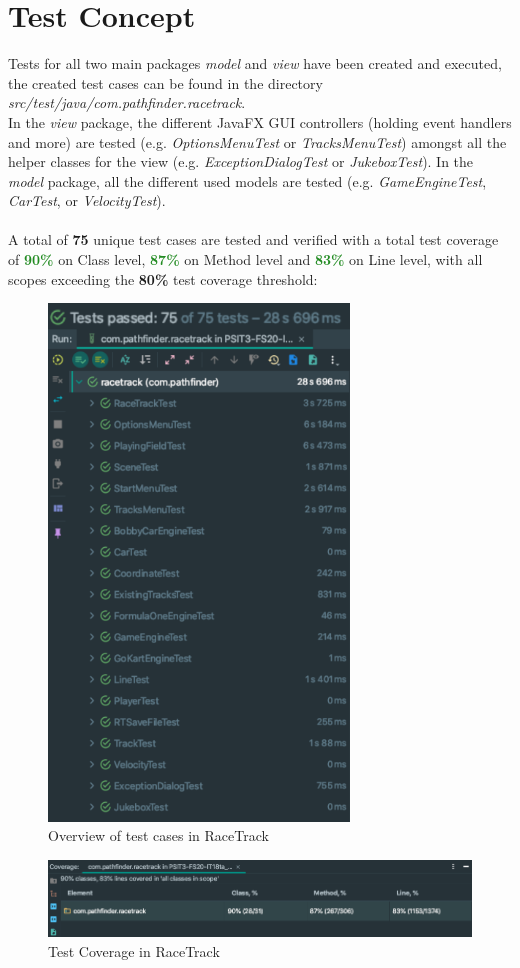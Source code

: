 \section{Test Concept}
	Tests for all two main packages \textit{model} and \textit{view} have been created and executed, the created test cases can be found in the directory \textit{src/test/java/com.pathfinder.racetrack}. \\
	In the \textit{view} package, the different JavaFX GUI controllers (holding event handlers and more) are tested (e.g. \textit{OptionsMenuTest} or \textit{TracksMenuTest}) amongst all the helper classes for the view (e.g. \textit{ExceptionDialogTest} or \textit{JukeboxTest}). In the \textit{model} package, all the different used models are tested (e.g. \textit{GameEngineTest}, \textit{CarTest}, or \textit{VelocityTest}).\\~\\
	A total of \textbf{75} unique test cases are tested and verified with a total test coverage of \textcolor{ForestGreen}{\textbf{90\%}} on Class level, \textcolor{ForestGreen}{\textbf{87\%}} on Method level and \textcolor{ForestGreen}{\textbf{83\%}} on Line level, with all scopes exceeding the \textbf{80\%} test coverage threshold:
	\begin{figure}[H]
		\centering
		\includegraphics[width=8cm,keepaspectratio,center]{img/Implementation_Test-Concept_Test-Overview.png}
		\caption{Overview of test cases in RaceTrack}
	\end{figure}
	\begin{figure}[H]
		\centering
		\includegraphics[width=12cm,keepaspectratio,center]{img/Implementation_Test-Concept_Coverage.png}
		\caption{Test Coverage in RaceTrack}
	\end{figure}
